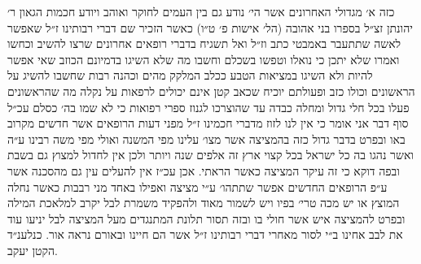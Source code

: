 \documentclass[12pt, openany]{book}
\begin{document}
\begin{multicols}{2}
כזה א׳ מגדולי האחרונים אשר הי׳ נודע גם בין העמים לחוקר ואוהב ויודע חכמות הגאון ר׳ יהונתן זצ״ל בספרו בני אהובה (הל׳ אישות פ׳ ט״ו) כאשר הזכיר שם דברי רבותינו ז״ל שאפשר לאשה שתתעבר באמבטי כתב וז״ל ואל תשגיח בדברי רופאים אחרונים שרצו להשיב וכחשו ואמרו שלא יתכן כי נואלו וטפשו בשכלם וחשבו מה שלא השיגו בדמיונם הכוזב שאי אפשר להיות ולא השיגו במציאות הטבע ככלב המלקק מהים וכהנה רבות שחשבו להשיג על הראשונים וכולו כזב ופעולתם יוכיח שכאב קטן אינם יכולים לרפאות על נקלה מה שהראשונים פעלו בכל חלי גדול ומחלה כבדה עד שהוצרכו לגנוז ספרי רפואות כי לא שמו בה׳ כסלם עכ״ל סוף דבר אני אומר כי אין לנו לזוז מדברי חכמינו ז״ל מפני דעות הרופאים אשר חדשים מקרוב באו ובפרט בדבר גדול כזה בהמציצה אשר מצו׳ עלינו מפי המשנה ואולי מפי משה רבינו ע״ה ואשר נהגו בה כל ישראל בכל קצוי ארץ זה אלפים שנה ויותר ולכן אין לחדול למצוץ גם בשבת ובפה דוקא כי זה עיקר המציצה כאשר הראתי. אכן עכ״ז אין להעלים עין גם מהסכנה אשר ע״פ הרופאים החדשים אפשר שתתהו׳ ע״י מציצה ואפילו באחד מני רבבות כאשר נחלה המוצץ או יש מכה טרי׳ בפיו ויש לשמור מאוד ולהפקיד משמרת לבל יקרב למלאכת המילה ובפרט להמציצה איש אשר חולי בו ובזה תסור תלונת המתנגדים מעל המציצה לבל יניעו עוד את לבב אחינו ב״י לסור מאחרי דברי רבותינו ז״ל אשר הם חיינו ובאורם נראה אור. כנלענ״ד הקטן יעקב.\\\vspace{0pt}

\end{multicols}\newpage
\end{document}
